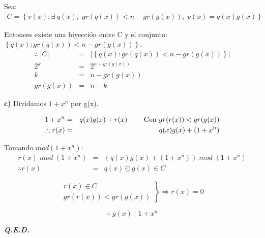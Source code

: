 \documentclass[12pt,a4paper]{report}
\newcommand{\QED}{\hfill \textit{\textbf{Q.E.D.}}}
\begin{document}
  			\vspace{3mm}
  			\par Sea:
  			\begin{eqnarray}
  				\nonumber C = \left\lbrace v(x) : \exists \; q(x), \; gr(q(x)) < n - gr(g(x)), \; v(x) = q(x) g(x) \right\rbrace
  			\end{eqnarray}

  			\par Entonces existe una biyección entre C y el conjunto: $\left\lbrace q(x) :  gr(q(x)) < n - gr(g(x)) \right\rbrace$.
  			\begin{eqnarray}
  				\nonumber \therefore \; \lvert C \rvert &=& \lvert \left\lbrace q(x) : gr(q(x)) < n - gr(g(x)) \right\rbrace \rvert \\
  				\nonumber 2^{k} &=& 2^{n - gr(g(x))} \\
  				\nonumber k &=& n - gr(g(x)) \\
  				\nonumber gr(g(x)) &=& n - k
  			\end{eqnarray}

  			\textbf{c)} Dividamos $1 + x^{n}$ por g(x).

  				\begin{eqnarray}
  						\nonumber 1 + x^{n} &=& q(x) g(x) + r(x) \qquad \textup{ Con } gr(r(x)) < gr(g(x)) \\
  						\nonumber \therefore r(x) &=& q(x) g(x) + (1 + x^{n})
  				\end{eqnarray}

  				\par Tomando $mod (1 + x^{n})$:
  					\begin{eqnarray}
  						\nonumber r(x) \; mod \; (1 + x^{n}) &=& (q(x) g(x) + (1 + x^{n})) \; mod \; (1 + x^{n}) \\
  						\nonumber \therefore r(x) &=& q(x) \odot g(x) \in C
  					\end{eqnarray}

  				\begin{equation*}
  	  				\left.
  	  				\begin{array}{l}
  	    				r(x) \in C \\
  	    				gr(r(x)) < gr(g(x))
  	  				\end{array}
  	 				\right\rbrace
  	 				\Rightarrow r(x) = 0
  			\end{equation*}

  			\[
  				\therefore \; g(x) \; | \; 1 + x^{n}
  			\]

  		\QED
\end{document}
